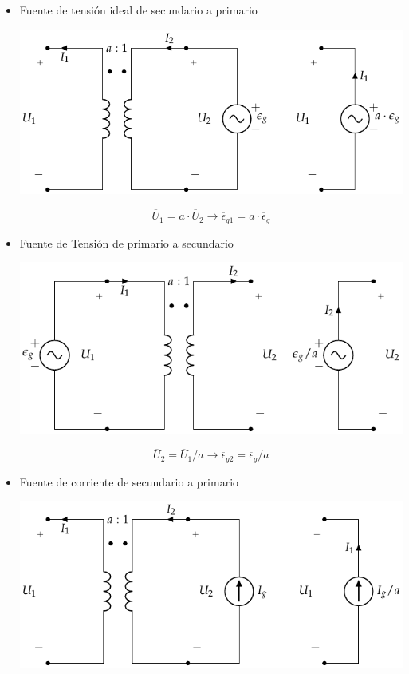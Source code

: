 \begin{itemize}
\item Fuente de tensión ideal de secundario a primario
  \begin{center}
    \includegraphics[height=.15\textheight]{../figs/TrafoIdeal_VSec.pdf}
  \end{center}
  \[
    \overline{U}_1 = a \cdot \overline{U}_2 \rightarrow
    \boxed{\overline{\epsilon}_{g1} = a \cdot \overline{\epsilon}_g}
  \]
\item Fuente de Tensión de primario a secundario
  \begin{center}
    \includegraphics[height=.15\textheight]{../figs/TrafoIdeal_VPrim.pdf}
  \end{center}

  \[
    \overline{U}_2 = \overline{U}_1 / a \rightarrow
    \boxed{\overline{\epsilon}_{g2} = \overline{\epsilon}_g / a}
  \]
\item Fuente de corriente de secundario a primario
  \begin{center}
    \includegraphics[height=.15\textheight]{../figs/TrafoIdeal_ISec.pdf}
  \end{center}


\end{itemize}
